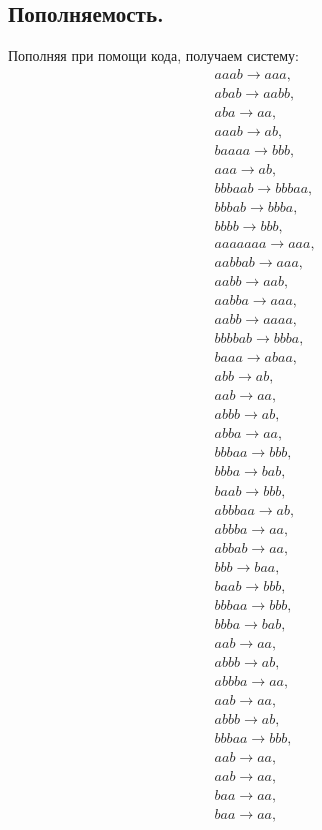 \documentclass[12pt]{article}
\begin{document}
\subsection*{Пополняемость.}
Пополняя при помощи кода, получаем систему:
\begin{align*}
& aaab \to aaa, \\
& abab \to aabb, \\
& aba \to aa, \\
& aaab \to ab, \\
& baaaa \to bbb, \\
& aaa \to ab, \\
& bbbaab \to bbbaa, \\
& bbbab \to bbba, \\
& bbbb \to bbb, \\
& aaaaaaa \to aaa, \\
& aabbab \to aaa, \\
& aabb \to aab, \\
& aabba \to aaa, \\
& aabb \to aaaa, \\
& bbbbab \to bbba, \\
& baaa \to abaa, \\
& abb \to ab, \\
& aab \to aa, \\
& abbb \to ab, \\
& abba \to aa, \\
& bbbaa \to bbb, \\
& bbba \to bab, \\
& baab \to bbb, \\
& abbbaa \to ab, \\
& abbba \to aa, \\
& abbab \to aa, \\
& bbb \to baa, \\
& baab \to bbb, \\
& bbbaa \to bbb, \\
& bbba \to bab, \\
& aab \to aa, \\
& abbb \to ab, \\
& abbba \to aa, \\
& aab \to aa, \\
& abbb \to ab, \\
& bbbaa \to bbb, \\
& aab \to aa, \\
& aab \to aa, \\
& baa \to aa, \\
& baa \to aa, \\

\end{align*}
\end{document}

